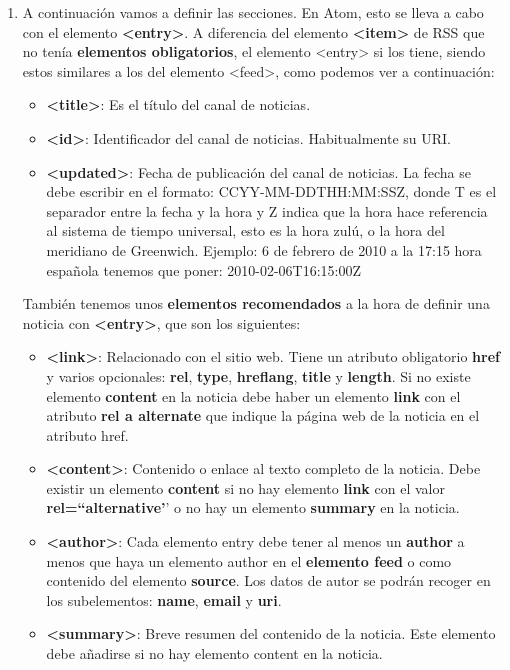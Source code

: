 \begin{enumerate}
    \item A continuación vamos a definir las secciones. En Atom, esto se lleva a cabo con el elemento \textbf{<entry>}. A diferencia del elemento \textbf{<item>} de RSS que no tenía \textbf{elementos obligatorios}, el elemento <entry> si los tiene, siendo estos similares a los del elemento <feed>, como podemos ver a continuación:

    \begin{itemize}
        \item \textbf{<title>}: Es el título del canal de noticias.
        \item \textbf{<id>}: Identificador del canal de noticias. Habitualmente su URI.
        \item \textbf{<updated>}: Fecha de publicación del canal de noticias. La fecha se debe escribir en el formato: CCYY-MM-DDTHH:MM:SSZ, donde T es el separador entre la fecha y la hora y Z indica que la hora hace referencia al sistema de tiempo universal, esto es la hora zulú, o la hora del meridiano de Greenwich. Ejemplo: 6 de febrero de 2010 a la 17:15 hora española tenemos que poner: 2010-02-06T16:15:00Z
    \end{itemize}

    También tenemos unos \textbf{elementos recomendados} a la hora de definir una noticia con \textbf{<entry>}, que son los siguientes:

    \begin{itemize}
        \item \textbf{<link>}: Relacionado con el sitio web. Tiene un atributo obligatorio \textbf{href} y varios opcionales: \textbf{rel}, \textbf{type}, \textbf{hreflang}, \textbf{title} y \textbf{length}. Si no existe elemento \textbf{content} en la noticia debe haber un elemento \textbf{link} con el atributo \textbf{rel a alternate} que indique la página web de la noticia en el atributo href.
        \item \textbf{<content>}: Contenido o enlace al texto completo de la noticia. Debe existir un elemento \textbf{content} si no hay elemento \textbf{link} con el valor \textbf{rel=``alternative'}' o no hay un elemento \textbf{summary} en la noticia.
        \item \textbf{<author>}: Cada elemento entry debe tener al menos un \textbf{author} a menos que haya un elemento author en el \textbf{elemento feed} o como contenido del elemento \textbf{source}. Los datos de autor se podrán recoger en los subelementos: \textbf{name}, \textbf{email} y \textbf{uri}.
        \item \textbf{<summary>}: Breve resumen del contenido de la noticia. Este elemento debe añadirse si no hay elemento content en la noticia.
    \end{itemize}


\end{enumerate}
